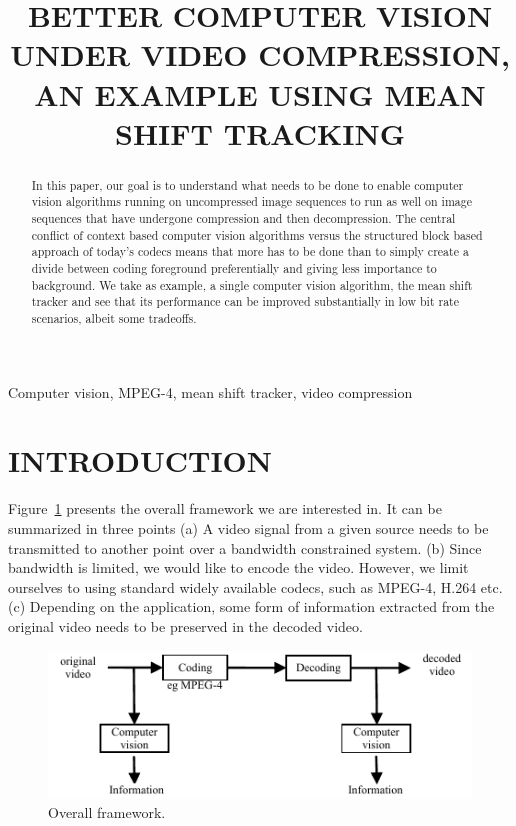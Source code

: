 \documentclass{article}
\title{BETTER COMPUTER VISION UNDER VIDEO COMPRESSION, 
AN EXAMPLE USING MEAN SHIFT TRACKING
}
\begin{document}
\ninept

\maketitle
%
\begin{abstract}
In this paper, our goal is to understand what needs to be done to enable computer vision algorithms running on uncompressed image sequences to run as well on image sequences that have undergone compression and then decompression.    The central conflict of context based computer vision algorithms versus the structured block based approach of today's codecs means that more has to be done than to simply create a divide between coding foreground preferentially and giving less importance to background.  We take as example, a single computer vision algorithm, the mean shift tracker and see that its performance can be improved substantially in low bit rate scenarios, albeit some tradeoffs.  \end{abstract}
%
\begin{keywords}
Computer vision, MPEG-4, mean shift tracker, video compression
\end{keywords}

\section{INTRODUCTION}
Figure~\ref{fig:ProblemStatement} presents the overall framework we are interested in.  It can be summarized in three points (a) A video signal from a given source needs to be transmitted to another point over a bandwidth constrained system.  (b) Since bandwidth is limited, we would like to encode the video.  However, we limit ourselves to using standard widely available codecs, such as MPEG-4, H.264 etc. (c) Depending on the application, some form of information extracted from the original video needs to be preserved in the decoded video. 

\begin{figure}[h]
			\centering
			\includegraphics[width=.45\textwidth]{figs/ICIP2009_BlockDiagram_1}
			\caption{Overall framework.}
			\label{fig:ProblemStatement}
\end{figure}
\end{document}
